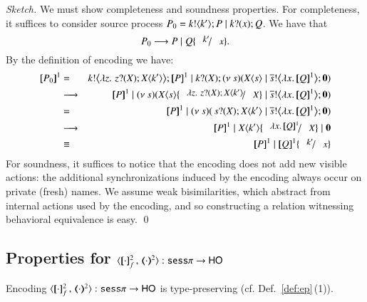 \begin{proof}[Sketch]
	We must show completeness and soundness properties. 
	For completeness, it suffices to consider source process
	$P_0 = k ! \langle k' \rangle ; P \;|\; k ? (x) ; Q$. We have that
%
	\[
		P_0 \red P \Par Q\subst{k'}{x}.
	\]
%
	By the definition of encoding we have:
	\begin{eqnarray*}
		\pmap{P_0}{1} & = & \bbout{k}{ \abs{z}{\,\binp{z}{X} \appl{X}{k'}} } \pmap{P}{1} \Par \binp{k}{X} \newsp{s}{\appl{X}{s} \Par \bbout{\dual{s}}{\abs{x} \pmap{Q}{1}} \inact}  \\
		& \red & \pmap{P}{1} \Par \newsp{s}{\appl{X}{s} \subst{\abs{z}{\,\binp{z}{X} \appl{X}{k'}}}{X} \Par \bbout{\dual{s}}{\abs{x}{\pmap{Q}{1}}} \inact} \\
		& = & \pmap{P}{1} \Par \newsp{s}{\,\binp{s}{X} \appl{X}{k'} \Par \bbout{\dual{s}}{\abs{x}{\pmap{Q}{1}}} \inact} \\
		& \red & \pmap{P}{1} \Par \appl{X}{k'} \subst{\abs{x} \pmap{Q}{1}}{X} \Par \inact \\
		& \scong & \pmap{P}{1} \Par \pmap{Q}{1}\subst{k'}{x}  
	\end{eqnarray*}
	For soundness, it suffices to notice that the encoding does not add new visible actions:
	the additional synchronizations induced by the encoding always occur on private (fresh) names.
	We assume weak bisimilarities, which abstract from internal actions used by the encoding,
	and so  constructing a relation witnessing behavioral equivalence is easy.
	\qed
\end{proof}


\subsection{Properties for $\fencod{\cdot}{\cdot}{2}{f}: \sessp \to \HO$}
\label{app:enc_sesp_to_HO}

\begin{proposition}\rm
	\label{app:enc_sesp_to_HO_t}
	Encoding $\fencod{\cdot}{\cdot}{2}{f}: \sessp \to \HO$  
	is type-preserving (cf. Def.~\ref{def:ep}\,(1)).
\end{proposition}

